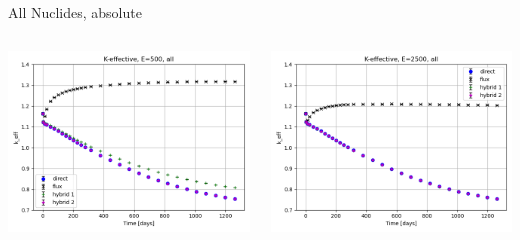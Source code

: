 \documentclass[
	11pt, %
	aspectratio=169, %
]{beamer}
\begin{document}
\begin{frame}{All Nuclides, absolute}
\begin{columns}[c]
\begin{column}{0.39\textwidth}
			\includegraphics[width=\textwidth]{../figures/keff/keff_all_500.png}
		\end{column}
		\begin{column}{0.39\textwidth}
			\includegraphics[width=\textwidth]{../figures/keff/keff_all_2500.png}


\end{column}
\end{columns}
\end{frame}
\end{document}

